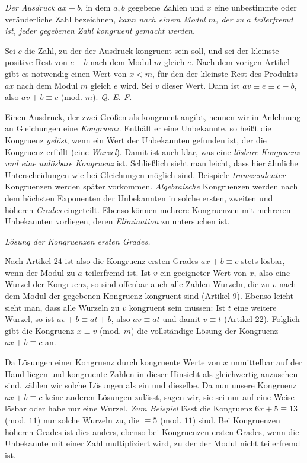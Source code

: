 
\emph{Der Ausdruck $ax+b$}, in dem $a, b$ gegebene Zahlen und $x$ eine unbestimmte oder veränderliche Zahl bezeichnen, \emph{kann nach einem Modul $m$, der zu $a$ teilerfremd ist, jeder gegebenen Zahl kongruent gemacht werden.}

Sei $c$ die Zahl, zu der der Ausdruck kongruent sein soll, und sei der kleinste positive Rest von $c-b$ nach dem Modul $m$ gleich $e$. Nach dem vorigen Artikel gibt es notwendig einen Wert von $x < m$, für den der kleinste Rest des Produkts $ax$ nach dem Modul $m$ gleich $e$ wird. Sei $v$ dieser Wert. Dann ist $av \equiv e \equiv c-b$, also $av+b \equiv c$ (mod. $m$). \emph{Q. E. F.}


Einen Ausdruck, der zwei Größen als kongruent angibt, nennen wir in Anlehnung an Gleichungen eine \emph{Kongruenz}. Enthält er eine Unbekannte, so heißt die Kongruenz \emph{gelöst}, wenn ein Wert der Unbekannten gefunden ist, der die Kongruenz erfüllt (eine \emph{Wurzel}). Damit ist auch klar, was eine \emph{lösbare Kongruenz und eine unlösbare Kongruenz} ist. Schließlich sieht man leicht, dass hier ähnliche Unterscheidungen wie bei Gleichungen möglich sind. Beispiele \emph{transzendenter} Kongruenzen werden später vorkommen. \emph{Algebraische} Kongruenzen werden nach dem höchsten Exponenten der Unbekannten in solche ersten, zweiten und höheren \emph{Grades} eingeteilt. Ebenso können mehrere Kongruenzen mit mehreren Unbekannten vorliegen, deren \emph{Elimination} zu untersuchen ist.

\begin{center}
\emph{Lösung der Kongruenzen ersten Grades.}
\end{center}


Nach Artikel 24 ist also die Kongruenz ersten Grades $ax+b \equiv c$ stets lösbar, wenn der Modul zu $a$ teilerfremd ist. Ist $v$ ein geeigneter Wert von $x$, also eine Wurzel der Kongruenz, so sind offenbar auch alle Zahlen Wurzeln, die zu $v$ nach dem Modul der gegebenen Kongruenz kongruent sind (Artikel 9). Ebenso leicht sieht man, dass alle Wurzeln zu $v$ kongruent sein müssen: Ist $t$ eine weitere Wurzel, so ist $av+b \equiv at+b$, also $av \equiv at$ und damit $v \equiv t$ (Artikel 22). Folglich gibt die Kongruenz $x \equiv v$ (mod. $m$) die vollständige Lösung der Kongruenz $ax+b \equiv c$ an.

Da Lösungen einer Kongruenz durch kongruente Werte von $x$ unmittelbar auf der Hand liegen und kongruente Zahlen in dieser Hinsicht als gleichwertig anzusehen sind, zählen wir solche Lösungen als ein und dieselbe. Da nun
unsere Kongruenz $ax+b \equiv c$ keine anderen Lösungen zulässt, sagen wir, sie sei nur auf eine Weise lösbar oder habe nur eine Wurzel. \emph{Zum Beispiel} lässt die Kongruenz $6x+5 \equiv 13$ (mod. $11$) nur solche Wurzeln zu, die $\equiv 5$ (mod. $11$) sind. Bei Kongruenzen höheren Grades ist dies anders, ebenso bei Kongruenzen ersten Grades, wenn die Unbekannte mit einer Zahl multipliziert wird, zu der der Modul nicht teilerfremd ist.

